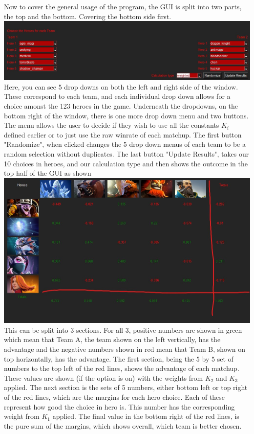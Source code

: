 \documentclass{article}
\begin{document}
Now to cover the general usage of the program, the GUI is split into two parts, the top and the bottom. Covering the bottom side first. \\
\includegraphics[width=15cm]{bottomGUI}
Here, you can see 5 drop downs on both the left and right side of the window. These correspond to each team, and each individual drop down allows for a choice amonst the 123 heroes in the game. Underneath the dropdowns, on the bottom right of the window, there is one more drop down menu and two buttons. The menu allows the user to decide if they wish to use all the constants $K_i$ defined earlier or to just use the raw winrate of each matchup. The first button "Randomize", when clicked changes the 5 drop down menus of each team to be a random selection without duplicates. The last button "Update Results", takes our 10 choices in heroes, and our calculation type and then shows the outcome in the top half of the GUI as shown \\
\includegraphics[width=15cm]{topGUI}
This can be split into 3 sections. For all 3, positive numbers are shown in green which mean that Team A, the team shown on the left vertically, has the advantage and the negative numbers shown in red mean that Team B, shown on top horizontally, has the advantage. The first section, being the 5 by 5 set of numbers to the top left of the red lines, shows the advantage of each matchup. These values are shown (if the option is on) with the weights from $K_2$ and $K_3$ applied. The next section is the sets of 5 numbers, either bottom left or top right of the red lines, which are the margins for each hero choice. Each of these represent how good the choice in hero is. This number has the corresponding weight from $K_1$ applied. The final value in the bottom right of the red lines, is the pure sum of the margins, which shows overall, which team is better chosen. \\
\end{document}

